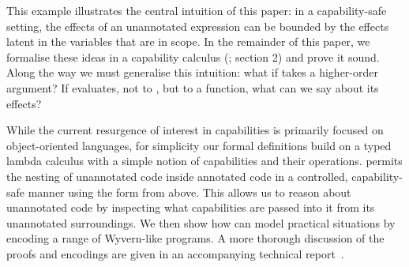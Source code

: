 This example illustrates the central intuition of this paper: in a capability-safe setting,
the effects of an unannotated expression can be bounded by the effects latent in the
variables that are in scope. In the remainder of this paper, we formalise these ideas
in a capability calculus (; section 2) and prove it sound. Along the way we
must generalise this intuition: what if  takes a higher-order argument? If
 evaluates, not to , but to a function, what can we say about its
effects?

While the current resurgence of interest in capabilities is primarily focused on
object-oriented languages, for simplicity our formal definitions build on a typed
lambda calculus with a simple notion of capabilities and their operations. 
permits the nesting of unannotated code inside annotated code in a controlled,
capability-safe manner using the  form from above. This allows us to
reason about unannotated code by inspecting what capabilities are passed into it
from its unannotated surroundings. We then show how  can model
practical situations by encoding a range of Wyvern-like programs. A more thorough
discussion of the proofs and encodings are given in an accompanying technical
report~\cite{ecs:2018:aaron-tr}.
